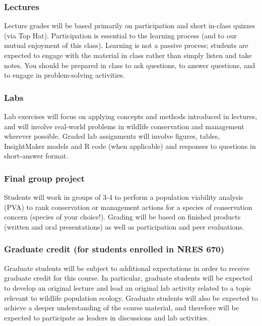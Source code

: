 \documentclass[
]{article}
\begin{document}
\subsubsection{Lectures}\label{lectures}

Lecture grades will be based primarily on participation and short
in-class quizzes (via Top Hat). Participation is essential to the
learning process (and to our mutual enjoyment of this class). Learning
is not a passive process; students are expected to engage with the
material in class rather than simply listen and take notes. You should
be prepared in class to ask questions, to answer questions, and to
engage in problem-solving activities.

\subsubsection{Labs}\label{labs}

Lab exercises will focus on applying concepts and methods introduced in
lectures, and will involve real-world problems in wildlife conservation
and management wherever possible. Graded lab assignments will involve
figures, tables, InsightMaker models and R code (when applicable) and
responses to questions in short-answer format.

\subsubsection{Final group project}\label{final-group-project}

Students will work in groups of 3-4 to perform a population viability
analysis (PVA) to rank conservation or management actions for a species
of conservation concern (species of your choice!). Grading will be based
on finished products (written and oral presentations) as well as
participation and peer evaluations.

\subsubsection{Graduate credit (for students enrolled in NRES
670)}\label{graduate-credit-for-students-enrolled-in-nres-670}

Graduate students will be subject to additional expectations in order to
receive graduate credit for this course. In particular, graduate
students will be expected to develop an original lecture and lead an
original lab activity related to a topic relevant to wildlife population
ecology. Graduate students will also be expected to achieve a deeper
understanding of the course material, and therefore will be expected to
participate as leaders in discussions and lab activities.
\end{document}
